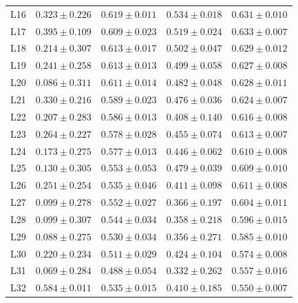 \begin{table}[t]
{\begin{tabular}{lcccc}
L16 & $0.323 \pm 0.226$ & $0.619 \pm 0.011$ & $0.534 \pm 0.018$ & $0.631 \pm 0.010$ \\
L17 & $0.395 \pm 0.109$ & $0.609 \pm 0.023$ & $0.519 \pm 0.024$ & $0.633 \pm 0.007$ \\
L18 & $0.214 \pm 0.307$ & $0.613 \pm 0.017$ & $0.502 \pm 0.047$ & $0.629 \pm 0.012$ \\
L19 & $0.241 \pm 0.258$ & $0.613 \pm 0.013$ & $0.499 \pm 0.058$ & $0.627 \pm 0.008$ \\
L20 & $0.086 \pm 0.311$ & $0.611 \pm 0.014$ & $0.482 \pm 0.048$ & $0.628 \pm 0.011$ \\
L21 & $0.330 \pm 0.216$ & $0.589 \pm 0.023$ & $0.476 \pm 0.036$ & $0.624 \pm 0.007$ \\
L22 & $0.207 \pm 0.283$ & $0.586 \pm 0.013$ & $0.408 \pm 0.140$ & $0.616 \pm 0.008$ \\
L23 & $0.264 \pm 0.227$ & $0.578 \pm 0.028$ & $0.455 \pm 0.074$ & $0.613 \pm 0.007$ \\
L24 & $0.173 \pm 0.275$ & $0.577 \pm 0.013$ & $0.446 \pm 0.062$ & $0.610 \pm 0.008$ \\
L25 & $0.130 \pm 0.305$ & $0.553 \pm 0.053$ & $0.479 \pm 0.039$ & $0.609 \pm 0.010$ \\
L26 & $0.251 \pm 0.254$ & $0.535 \pm 0.046$ & $0.411 \pm 0.098$ & $0.611 \pm 0.008$ \\
L27 & $0.099 \pm 0.278$ & $0.552 \pm 0.027$ & $0.366 \pm 0.197$ & $0.604 \pm 0.011$ \\
L28 & $0.099 \pm 0.307$ & $0.544 \pm 0.034$ & $0.358 \pm 0.218$ & $0.596 \pm 0.015$ \\
L29 & $0.088 \pm 0.275$ & $0.530 \pm 0.034$ & $0.356 \pm 0.271$ & $0.585 \pm 0.010$ \\
L30 & $0.220 \pm 0.234$ & $0.511 \pm 0.029$ & $0.424 \pm 0.104$ & $0.574 \pm 0.008$ \\
L31 & $0.069 \pm 0.284$ & $0.488 \pm 0.054$ & $0.332 \pm 0.262$ & $0.557 \pm 0.016$ \\
L32 & $0.584 \pm 0.011$ & $0.535 \pm 0.015$ & $0.410 \pm 0.185$ & $0.550 \pm 0.007$ \\
\bottomrule
\end{tabular}%
}
\end{table}
